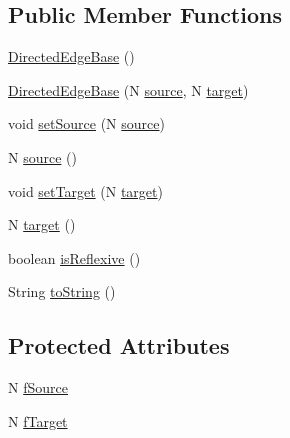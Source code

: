 \subsection*{Public Member Functions}
\begin{DoxyCompactItemize}
\item 
\hyperlink{classorg_1_1tzi_1_1use_1_1graph_1_1_directed_edge_base_3_01_n_01_4_a5c2e183a022cd08a918e1ce3917fdae1}{Directed\-Edge\-Base} ()
\item 
\hyperlink{classorg_1_1tzi_1_1use_1_1graph_1_1_directed_edge_base_3_01_n_01_4_a259af1193626e67cd4cab21e012d023c}{Directed\-Edge\-Base} (N \hyperlink{classorg_1_1tzi_1_1use_1_1graph_1_1_directed_edge_base_3_01_n_01_4_ad510789a585cfab50b24a8c4c937fe51}{source}, N \hyperlink{classorg_1_1tzi_1_1use_1_1graph_1_1_directed_edge_base_3_01_n_01_4_adac27e7002b137e5d72b4268c467efa5}{target})
\item 
void \hyperlink{classorg_1_1tzi_1_1use_1_1graph_1_1_directed_edge_base_3_01_n_01_4_a4765a89ee167cdbab79a60a97ed20f57}{set\-Source} (N \hyperlink{classorg_1_1tzi_1_1use_1_1graph_1_1_directed_edge_base_3_01_n_01_4_ad510789a585cfab50b24a8c4c937fe51}{source})
\item 
N \hyperlink{classorg_1_1tzi_1_1use_1_1graph_1_1_directed_edge_base_3_01_n_01_4_ad510789a585cfab50b24a8c4c937fe51}{source} ()
\item 
void \hyperlink{classorg_1_1tzi_1_1use_1_1graph_1_1_directed_edge_base_3_01_n_01_4_a354ebc4acbb9e8116086827c37928f7f}{set\-Target} (N \hyperlink{classorg_1_1tzi_1_1use_1_1graph_1_1_directed_edge_base_3_01_n_01_4_adac27e7002b137e5d72b4268c467efa5}{target})
\item 
N \hyperlink{classorg_1_1tzi_1_1use_1_1graph_1_1_directed_edge_base_3_01_n_01_4_adac27e7002b137e5d72b4268c467efa5}{target} ()
\item 
boolean \hyperlink{classorg_1_1tzi_1_1use_1_1graph_1_1_directed_edge_base_3_01_n_01_4_adf87e2900f29023cbeff0719ef7f0abc}{is\-Reflexive} ()
\item 
String \hyperlink{classorg_1_1tzi_1_1use_1_1graph_1_1_directed_edge_base_3_01_n_01_4_a1ab415b6f700fdfb487ca356bac8d9db}{to\-String} ()
\end{DoxyCompactItemize}
\subsection*{Protected Attributes}
\begin{DoxyCompactItemize}
\item 
N \hyperlink{classorg_1_1tzi_1_1use_1_1graph_1_1_directed_edge_base_3_01_n_01_4_a20592744d83ab9e428332bad76f780ff}{f\-Source}
\item 
N \hyperlink{classorg_1_1tzi_1_1use_1_1graph_1_1_directed_edge_base_3_01_n_01_4_a3fff843b38aa9d153620fbe51cf29362}{f\-Target}
\end{DoxyCompactItemize}


